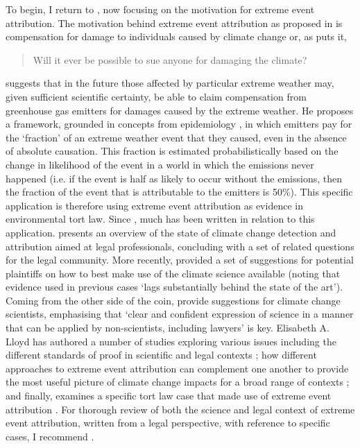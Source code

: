   To begin, I return to  \citep{allen_liability_2003}, now focusing on the motivation for extreme event attribution. The motivation behind extreme event attribution as proposed in  is compensation for damage to individuals caused by climate change or, as \citeauthor{allen_liability_2003} puts it, 
  \begin{quote}
    Will it ever be possible to sue anyone for damaging the climate?
  \end{quote}
  \citeauthor{allen_liability_2003} suggests that in the future those affected by particular extreme weather may, given sufficient scientific certainty, be able to claim compensation from greenhouse gas emitters for damages caused by the extreme weather. He proposes a framework, grounded in concepts from epidemiology \citep{stone_end--end_2005}, in which emitters pay for the `fraction' of an extreme weather event that they caused, even in the absence of absolute causation. This fraction is estimated probabilistically based on the change in likelihood of the event in a world in which the emissions never happened (i.e. if the event is half as likely to occur without the emissions, then the fraction of the event that is attributable to the emitters is 50\%).
  This specific application is therefore using extreme event attribution as evidence in environmental tort law. Since \citet{allen_liability_2003}, much has been written in relation to this application. \citet{allen_scientific_2007} presents an overview of the state of climate change detection and attribution aimed at legal professionals, concluding with a set of related questions for the legal community. More recently, \citet{stuart-smith_filling_2021} provided a set of suggestions for potential plaintiffs on how to best make use of the climate science available (noting that evidence used in previous cases `lags substantially behind the state of the art'). Coming from the other side of the coin, \citet{marjanac_acts_2017} provide suggestions for climate change scientists, emphasising that `clear and confident expression of science in a manner that can be applied by non-scientists, including lawyers' is key. Elisabeth A. Lloyd has authored a number of studies exploring various issues including the different standards of proof in scientific and legal contexts \citep{lloyd_climate_2021}; how different approaches to extreme event attribution can complement one another to provide the most useful picture of climate change impacts for a broad range of contexts \citep{lloyd_climate_2018,lloyd_environmental_2020}; and finally, examines a specific tort law case that made use of extreme event attribution \citep{lloyd_climate_2021-1}. For thorough review of both the science and legal context of extreme event attribution, written from a legal perspective, with reference to specific cases, I recommend \citet{burger_law_2020,marjanac_extreme_2018}.
  

